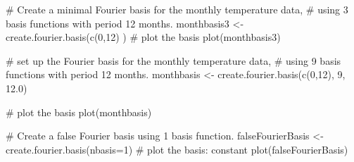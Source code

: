\begin{Examples}
\begin{ExampleCode}
# Create a minimal Fourier basis for the monthly temperature data, 
#  using 3 basis functions with period 12 months.
monthbasis3 <- create.fourier.basis(c(0,12) )
#  plot the basis
plot(monthbasis3)

# set up the Fourier basis for the monthly temperature data,
#  using 9 basis functions with period 12 months.
monthbasis <- create.fourier.basis(c(0,12), 9, 12.0)

#  plot the basis
plot(monthbasis)

# Create a false Fourier basis using 1 basis function.  
falseFourierBasis <- create.fourier.basis(nbasis=1)
#  plot the basis:  constant 
plot(falseFourierBasis)

\end{ExampleCode}
\end{Examples}

